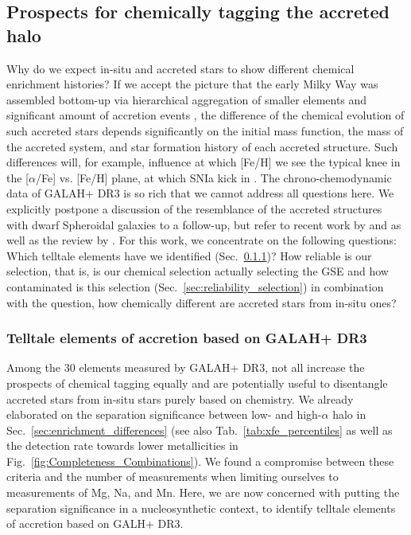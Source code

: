 \documentclass[fleqn,usenatbib]{mnras}
\begin{document}
\subsection{Prospects for chemically tagging the accreted halo} \label{sec:prospects_chem_tagg}

Why do we expect in-situ and accreted stars to show different chemical enrichment histories? If we accept the picture that the early Milky Way was assembled bottom-up via hierarchical aggregation of smaller elements and significant amount of accretion events \citep[e.g.][]{Searle1978}, the difference of the chemical evolution of such accreted stars depends significantly on the initial mass function, the mass of the accreted system, and star formation history of each accreted structure. Such differences will, for example, influence at which [Fe/H] we see the typical knee in the [$\alpha$/Fe] vs. [Fe/H] plane, at which SNIa kick in \citep[e.g.][]{Tinsley1979, GilmoreWyse1991, McWilliam1997, Matteucci2021}. The chrono-chemodynamic data of GALAH+ DR3 is so rich that we cannot address all questions here. We explicitly postpone a discussion of the resemblance of the accreted structures with dwarf Spheroidal galaxies to a follow-up, but refer to recent work by \citet{Hayes2018} and \citet{Monty2020} as well as the review by \citet{Nissen2018}. For this work, we concentrate on the following questions: Which telltale elements have we identified (Sec.~\ref{sec:tell_tale})? How reliable is our selection, that is, is our chemical selection actually selecting the GSE and how contaminated is this selection (Sec.~\ref{sec:reliability_selection}) in combination with the question, how chemically different are accreted stars from in-situ ones?

\subsubsection{Telltale elements of accretion based on GALAH+ DR3} \label{sec:tell_tale}

Among the 30 elements measured by GALAH+ DR3, not all increase the prospects of chemical tagging equally \citep{Ting2015} and are potentially useful to disentangle accreted stars from in-situ stars purely based on chemistry. We already elaborated on the separation significance between low- and high-$\alpha$ halo in Sec.~\ref{sec:enrichment_differences} (see also Tab.~\ref{tab:xfe_percentiles} as well as the detection rate towards lower metallicities in Fig.~\ref{fig:Completeness_Combinations}). We found a compromise between these criteria and the number of measurements when limiting ourselves to measurements of Mg, Na, and Mn. Here, we are now concerned with putting the separation significance in a nucleosynthetic context, to identify telltale elements of accretion based on GALH+ DR3.
\end{document}
